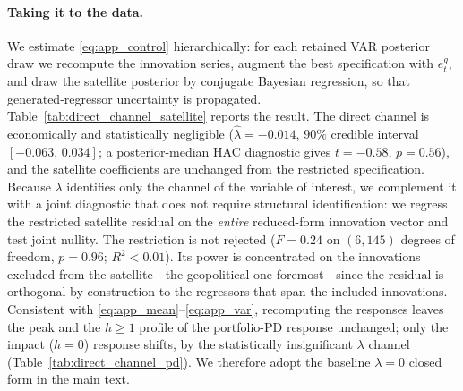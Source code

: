 \paragraph{Taking it to the data.}
We estimate \eqref{eq:app_control} hierarchically: for each retained VAR
posterior draw we recompute the innovation series, augment the best
specification with $e_t^{g}$, and draw the satellite posterior by conjugate
Bayesian regression, so that generated-regressor uncertainty is propagated.
Table~\ref{tab:direct_channel_satellite} reports the result. The direct channel
is economically and statistically negligible ($\widehat\lambda=-0.014$, $90\%$
credible interval $[-0.063,\,0.034]$; a posterior-median HAC diagnostic gives
$t=-0.58$, $p=0.56$), and the satellite coefficients are unchanged from the
restricted specification. Because $\lambda$ identifies only the channel of the
variable of interest, we complement it with a joint diagnostic that does not
require structural identification: we regress the restricted satellite residual
on the \emph{entire} reduced-form innovation vector and test joint nullity. The
restriction is not rejected ($F=0.24$ on $(6,145)$ degrees of freedom,
$p=0.96$; $R^2<0.01$). Its power is concentrated on the innovations excluded
from the satellite---the geopolitical one foremost---since the residual is
orthogonal by construction to the regressors that span the included
innovations. Consistent with \eqref{eq:app_mean}--\eqref{eq:app_var},
recomputing the responses leaves the peak and the $h\ge1$ profile of the
portfolio-PD response unchanged; only the impact ($h=0$) response shifts, by the
statistically insignificant $\lambda$ channel
(Table~\ref{tab:direct_channel_pd}). We therefore adopt the baseline
$\lambda=0$ closed form in the main text.


